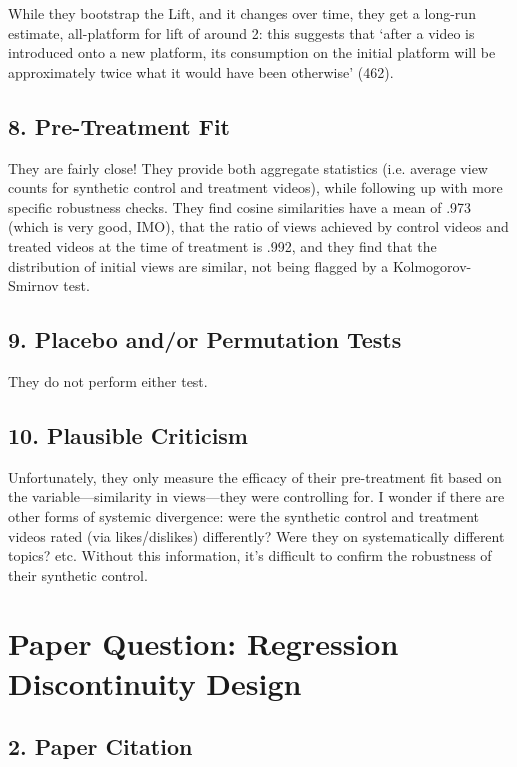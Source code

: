 \documentclass{article}
\begin{document}
While they bootstrap the Lift, and it changes over time, they get a long-run estimate, all-platform for lift of around 2: this suggests that `after a video is introduced onto a new platform, its consumption on the initial platform will be approximately twice what it would have been otherwise' (462).

\subsection*{8. Pre-Treatment Fit}

They are fairly close! They provide both aggregate statistics (i.e. average view counts for synthetic control and treatment videos), while following up with more specific robustness checks. They find cosine similarities have a mean of .973 (which is very good, IMO), that the ratio of views achieved by control videos and treated videos at the time of treatment is .992,  and they find that the distribution of initial views are similar, not being flagged by a Kolmogorov-Smirnov test.

\subsection*{9. Placebo and/or Permutation Tests}

They do not perform either test.

\subsection*{10. Plausible Criticism}

Unfortunately, they only measure the efficacy of their pre-treatment fit based on the variable—similarity in views—they were controlling for. I wonder if there are other forms of systemic divergence: were the synthetic control and treatment videos rated (via likes/dislikes) differently? Were they on systematically different topics? etc. Without this information, it's difficult to confirm the robustness of their synthetic control.

\section{Paper Question: Regression Discontinuity Design}

\subsection*{2. Paper Citation}
\end{document}
